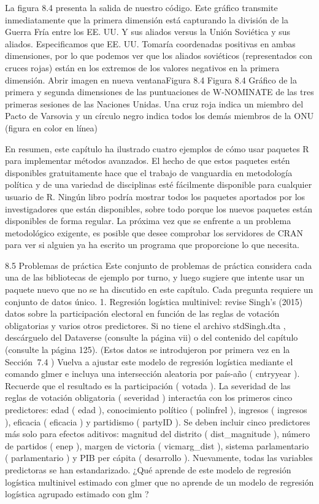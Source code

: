 \documentclass[
]{book}
\begin{document}
La figura 8.4 presenta la salida de nuestro código. Este gráfico transmite inmediatamente que la primera dimensión está capturando la división de la Guerra Fría entre los EE. UU. Y sus aliados versus la Unión Soviética y sus aliados. Especificamos que EE. UU. Tomaría coordenadas positivas en ambas dimensiones, por lo que podemos ver que los aliados soviéticos (representados con cruces rojas) están en los extremos de los valores negativos en la primera dimensión.
Abrir imagen en nueva ventanaFigura 8.4
Figura 8.4
Gráfico de la primera y segunda dimensiones de las puntuaciones de W-NOMINATE de las tres primeras sesiones de las Naciones Unidas. Una cruz roja indica un miembro del Pacto de Varsovia y un círculo negro indica todos los demás miembros de la ONU (figura en color en línea)

En resumen, este capítulo ha ilustrado cuatro ejemplos de cómo usar paquetes R para implementar métodos avanzados. El hecho de que estos paquetes estén disponibles gratuitamente hace que el trabajo de vanguardia en metodología política y de una variedad de disciplinas esté fácilmente disponible para cualquier usuario de R. Ningún libro podría mostrar todos los paquetes aportados por los investigadores que están disponibles, sobre todo porque los nuevos paquetes están disponibles de forma regular. La próxima vez que se enfrente a un problema metodológico exigente, es posible que desee comprobar los servidores de CRAN para ver si alguien ya ha escrito un programa que proporcione lo que necesita.

8.5 Problemas de práctica
Este conjunto de problemas de práctica considera cada una de las bibliotecas de ejemplo por turno, y luego sugiere que intente usar un paquete nuevo que no se ha discutido en este capítulo. Cada pregunta requiere un conjunto de datos único.
1.
Regresión logística multinivel: revise Singh's (2015) datos sobre la participación electoral en función de las reglas de votación obligatorias y varios otros predictores. Si no tiene el archivo stdSingh.dta , descárguelo del Dataverse (consulte la página vii) o del contenido del capítulo (consulte la página 125). (Estos datos se introdujeron por primera vez en la Sección  7.4 ) Vuelva a ajustar este modelo de regresión logística mediante el comando glmer e incluya una intersección aleatoria por país-año ( cntryyear ). Recuerde que el resultado es la participación ( votada ). La severidad de las reglas de votación obligatoria ( severidad ) interactúa con los primeros cinco predictores: edad ( edad ), conocimiento político ( polinfrel ), ingresos ( ingresos ), eficacia ( eficacia ) y partidismo ( partyID ). Se deben incluir cinco predictores más solo para efectos aditivos: magnitud del distrito ( dist\_magnitude ), número de partidos ( enep ), margen de victoria ( vicmarg\_dist ), sistema parlamentario ( parlamentario ) y PIB per cápita ( desarrollo ). Nuevamente, todas las variables predictoras se han estandarizado. ¿Qué aprende de este modelo de regresión logística multinivel estimado con glmer que no aprende de un modelo de regresión logística agrupado estimado con glm ?
\end{document}
